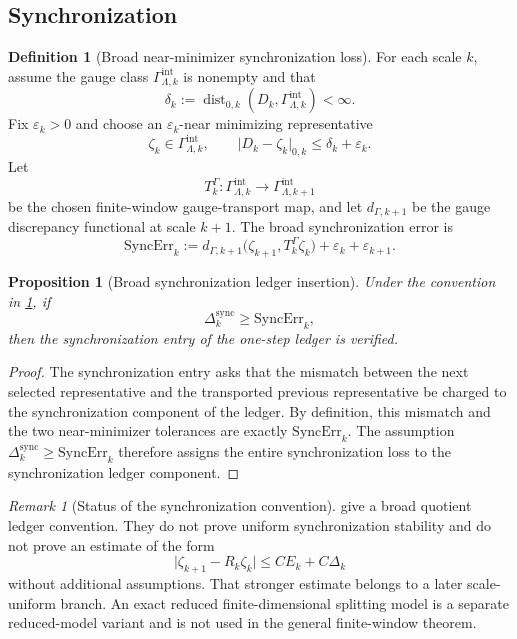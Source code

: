 \documentclass[11pt]{article}
\numberwithin{equation}{section}
\theoremstyle{plain}
\newtheorem{proposition}[theorem]{Proposition}
\theoremstyle{definition}
\newtheorem{definition}[theorem]{Definition}
\theoremstyle{remark}
\newtheorem{remark}[theorem]{Remark}
\newcommand{\intg}{\mathrm{int}}
\newcommand{\sync}{\mathrm{sync}}
\newcommand{\Dist}{\operatorname{dist}}
\begin{document}
\subsection{Synchronization}

\begin{definition}[Broad near-minimizer synchronization loss]\label{def:broad-sync}
For each scale \(k\), assume the gauge class
\(\Gamma_{\Lambda,k}^{\intg}\) is nonempty and that
\[
  \delta_k
  :=
  \Dist_{0,k}(D_k,\Gamma_{\Lambda,k}^{\intg})<\infty .
\]
Fix \(\varepsilon_k>0\) and choose an \(\varepsilon_k\)-near minimizing
representative
\[
  \zeta_k\in\Gamma_{\Lambda,k}^{\intg},
  \qquad
  \lvert D_k-\zeta_k\rvert_{0,k}
  \le
  \delta_k+\varepsilon_k.
\]
Let
\[
  T_k^\Gamma:
  \Gamma_{\Lambda,k}^{\intg}\to\Gamma_{\Lambda,k+1}^{\intg}
\]
be the chosen finite-window gauge-transport map, and let
\(d_{\Gamma,k+1}\) be the gauge discrepancy functional at scale \(k+1\).
The broad synchronization error is
\[
  \mathrm{SyncErr}_k
  :=
  d_{\Gamma,k+1}\bigl(\zeta_{k+1},
  T_k^\Gamma\zeta_k\bigr)
  +
  \varepsilon_k+\varepsilon_{k+1}.
\]
\end{definition}

\begin{proposition}[Broad synchronization ledger insertion]
\label{prop:broad-sync-insertion}
Under the convention in \cref{def:broad-sync}, if
\[
  \Delta_k^{\sync}\ge \mathrm{SyncErr}_k,
\]
then the synchronization entry of the one-step ledger is verified.
\end{proposition}

\begin{proof}
The synchronization entry asks that the mismatch between the next selected
representative and the transported previous representative be charged to the
synchronization component of the ledger.  By definition, this mismatch and the
two near-minimizer tolerances are exactly \(\mathrm{SyncErr}_k\).  The
assumption \(\Delta_k^{\sync}\ge\mathrm{SyncErr}_k\) therefore assigns the
entire synchronization loss to the synchronization ledger component.
\end{proof}

\begin{remark}[Status of the synchronization convention]
 give a broad quotient
ledger convention.  They do not prove uniform synchronization stability and
do not prove an estimate of the form
\[
  \lvert \zeta_{k+1}-R_k\zeta_k\rvert
  \le
  C E_k+C\Delta_k
\]
without additional assumptions.  That stronger estimate belongs to a later
scale-uniform branch.  An exact reduced finite-dimensional splitting model is
a separate reduced-model variant and is not used in the general finite-window theorem.
\end{remark}
\end{document}
